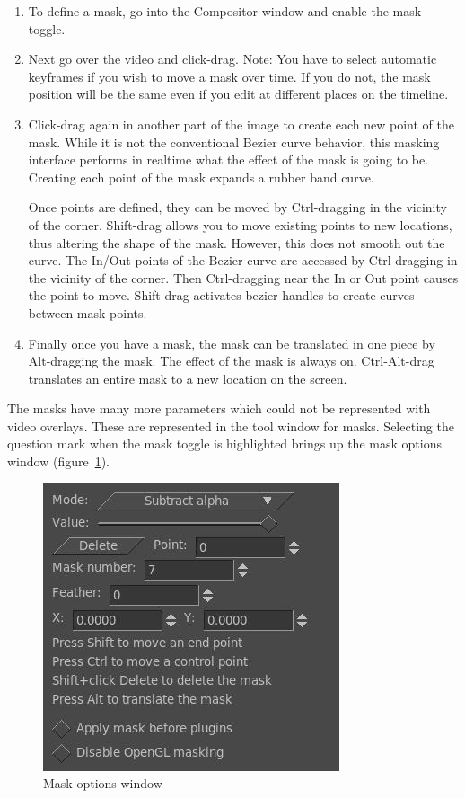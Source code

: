 \begin{enumerate}
    \item To define a mask, go into the Compositor window and enable the mask toggle.
    \item  Next go over the video and click-drag. 
        Note: You have to select automatic keyframes if you wish to move a mask over time.  
        If you do not, the mask position will be the same even if you edit at different places on the timeline.
    \item  Click-drag again in another part of the image to create each new point of the mask. 
        While it is not the conventional Bezier curve behavior, this masking interface performs in realtime what the effect 
        of the mask is going to be. Creating each point of the mask expands a rubber band curve.

        Once points are defined, they can be moved by Ctrl-dragging in the vicinity of the corner. 
        Shift-drag allows you to move existing points to new locations, thus altering the shape of the mask.  
        However, this does not smooth out the curve. 
        The In/Out points of the Bezier curve are accessed by Ctrl-dragging in the vicinity of the corner. 
        Then Ctrl-dragging near the In or Out point causes the point to move.  
        Shift-drag activates bezier handles to create curves between mask points.       

    \item  Finally once you have a mask, the mask can be translated in one piece by Alt-dragging the mask.
        The effect of the mask is always on.  
        Ctrl-Alt-drag translates an entire mask to a new location on the
        screen.
\end{enumerate}

The masks have many more parameters which could not be represented with video overlays. 
These are represented in the tool window for masks. 
Selecting the question mark when the mask toggle is highlighted brings up the mask options window (figure~\ref{fig:mask_window}).

\begin{figure}[htpb]
    \centering
    \includegraphics[width=0.6\linewidth]{images/mask_window.png}
    \caption{Mask options window}
    \label{fig:mask_window}
\end{figure}

